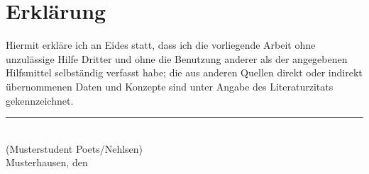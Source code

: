 
\cleardoublepage
\thispagestyle{plain}
\vspace*{\fill}

\section*{Erklärung}

Hiermit erkläre ich an Eides statt, dass ich die vorliegende
Arbeit ohne unzulässige Hilfe Dritter und ohne die Benutzung anderer
als der angegebenen Hilfsmittel selbständig verfasst habe;
die aus anderen Quellen direkt oder indirekt übernommenen Daten und Konzepte
sind unter Angabe des Literaturzitats gekennzeichnet.

\vskip2cm

\rule{5cm}{0.4pt}\\
(Musterstudent Poets/Nehlsen)\\
Musterhausen, den \duedate